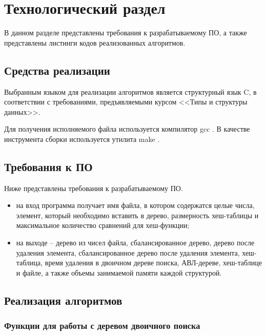 \chapter{Технологический раздел}

В данном разделе представлены требования к разрабатываемому ПО, а также представлены листинги кодов реализованных алгоритмов.

\section{Средства реализации}

Выбранным языком для реализации алгоритмов является структурный язык C, в соответствии с требованиями, предъявляемыми курсом <<Типы и структуры данных>>. 

Для получения исполняемого файла используется компилятор gcc \cite{gcc}. В качестве инструмента сборки используется утилита make \cite{make}.

\section{Требования к ПО}

Ниже представлены требования к разрабатываемому ПО.

\begin{itemize}[$\bullet$]
    \item на вход программа получает имя файла, в котором содержатся целые числа, элемент, который необходимо вставить в дерево, размерность хеш-таблицы и максимальное количество сравнений для хеш-функции;
    \item на выходе -- дерево из чисел файла, сбалансированное дерево, дерево после удаления элемента, сбалансированное дерево после удаления элемента, хеш-таблица, время удаления в двоичном дереве поиска, АВЛ-дереве, хеш-таблице и файле, а также объемы занимаемой памяти каждой структурой.
\end{itemize}

\clearpage

\section{Реализация алгоритмов}

\subsection{Функции для работы с деревом двоичного поиска}

